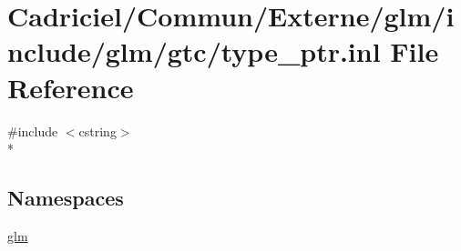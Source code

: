 \hypertarget{type__ptr_8inl}{}\section{Cadriciel/\+Commun/\+Externe/glm/include/glm/gtc/type\+\_\+ptr.inl File Reference}
\label{type__ptr_8inl}
{\ttfamily \#include $<$cstring$>$}\\*
\subsection*{Namespaces}
\begin{DoxyCompactItemize}
\item 
 \hyperlink{namespaceglm}{glm}
\end{DoxyCompactItemize}
